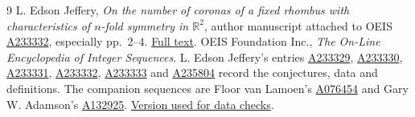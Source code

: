 \documentclass[11pt,letterpaper]{article}
\newcommand{\oid}[1]{\href{https://oeis.org/A#1}{A#1}}
\begin{document}
\begin{thebibliography}{9}
L. Edson Jeffery, \emph{On the number of coronas of a fixed rhombus with characteristics of $n$-fold symmetry in $\mathbb R^2$}, author manuscript attached to OEIS \oid{233332}, especially pp.~2--4.
\href{https://oeis.org/A233332/a233332_5.pdf}{Full text}.
OEIS Foundation Inc., \emph{The On-Line Encyclopedia of Integer Sequences}.
L. Edson Jeffery's entries \oid{233329}, \oid{233330}, \oid{233331}, \oid{233332}, \oid{233333} and \oid{235804} record the conjectures, data and definitions. The companion sequences are Floor van Lamoen's \oid{076454} and Gary W. Adamson's \oid{132925}.
\href{https://github.com/oeis/oeisdata/tree/976b0c73e00453b1c1e6f16d83108cb9bb744c3b}{Version used for data checks}.
\end{thebibliography}
\end{document}

